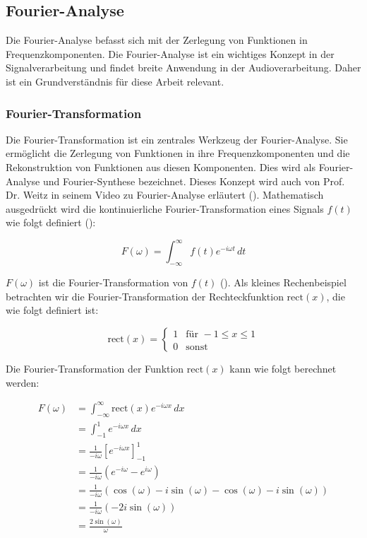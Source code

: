 \documentclass[11pt,a4paper]{article}
\begin{document}
\newpage
\subsection{Fourier-Analyse}
Die Fourier-Analyse befasst sich mit der Zerlegung von Funktionen in Frequenzkomponenten. Die 
Fourier-Analyse ist ein wichtiges Konzept in der Signalverarbeitung und findet breite Anwendung 
in der Audioverarbeitung. Daher ist ein Grundverständnis für diese Arbeit relevant. 

\subsubsection{Fourier-Transformation}
Die Fourier-Transformation ist ein zentrales Werkzeug der Fourier-Analyse. Sie ermöglicht die 
Zerlegung von Funktionen in ihre Frequenzkomponenten und die Rekonstruktion von Funktionen aus 
diesen Komponenten. Dies wird als Fourier-Analyse und Fourier-Synthese bezeichnet. Dieses Konzept 
wird auch von Prof. Dr. Weitz in seinem Video zu Fourier-Analyse erläutert 
(\cite[2:20]{weitz2023fourier}). Mathematisch ausgedrückt wird die kontinuierliche 
Fourier-Transformation eines Signals \( f(t) \) wie folgt definiert 
(\cite[Chapter~5]{hansen2014fourier}): 

\begin{equation*}
F(\omega) = \int_{-\infty}^{\infty} f(t) e^{-i \omega t} \, dt
\label{eq:fourier_transform}
\end{equation*}

\noindent
\(F(\omega)\) ist die Fourier-Transformation von \(f(t)\) 
(\cite[49:27]{weitz2023fourier}). Als kleines Rechenbeispiel betrachten wir die 
Fourier-Transformation der Rechteckfunktion \( \text{rect}(x) \), die wie folgt definiert ist:

\[
\text{rect}(x) = 
\begin{cases} 
1 & \text{für } -1 \leq x \leq 1 \\
0 & \text{sonst}
\end{cases}
\]

\noindent
Die Fourier-Transformation der Funktion \( \text{rect}(x) \) kann wie folgt berechnet werden:

\begin{equation*}
\begin{split}
F(\omega) &= \int_{-\infty}^{\infty} \text{rect}(x) e^{-i \omega x} \, dx \\
&= \int_{-1}^{1} e^{-i \omega x} \, dx \\
&= \frac{1}{-i \omega} \left[ e^{-i \omega x} \right]_{-1}^{1} \\
&= \frac{1}{-i \omega} \left( e^{-i \omega} - e^{i \omega} \right) \\
&= \frac{1}{-i \omega} \left( \cos(\omega) - i \sin(\omega) - \cos(\omega) - i \sin(\omega) \right) \\
&= \frac{1}{-i \omega} \left( -2 i \sin(\omega) \right) \\
&= \frac{2 \sin(\omega)}{\omega}
\end{split}
\end{equation*}
\noindent
\end{document}

